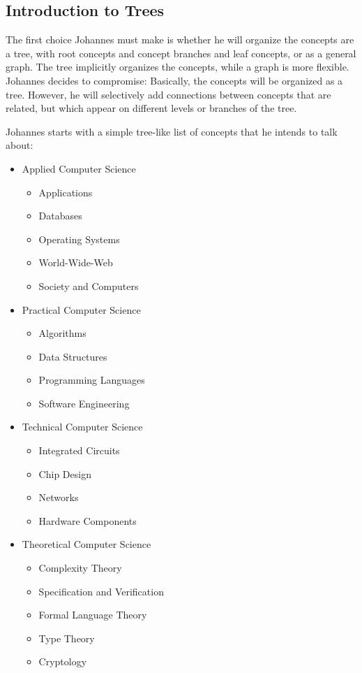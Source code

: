 \subsection{Introduction to Trees}

The first choice Johannes must make is whether he will organize the
concepts are a tree, with root concepts and concept branches and leaf
concepts, or as a general graph. The tree implicitly organizes the
concepts, while a graph is more flexible. Johannes decides to
compromise: Basically, the concepts will be organized as a
tree. However, he will selectively add connections between concepts
that are related, but which appear on different levels or branches of
the tree.

Johannes starts with a simple tree-like list of concepts that he
intends to talk about: 
\begin{itemize}
\item Applied Computer Science
  \begin{itemize}
  \item Applications
  \item Databases
  \item Operating Systems
  \item World-Wide-Web
  \item Society and Computers
  \end{itemize}
\item Practical Computer Science
  \begin{itemize}
  \item Algorithms
  \item Data Structures
  \item Programming Languages
  \item Software Engineering 
  \end{itemize}
\item Technical Computer Science
  \begin{itemize}
  \item Integrated Circuits
  \item Chip Design
  \item Networks
  \item Hardware Components
  \end{itemize}
\item Theoretical Computer Science
  \begin{itemize}
  \item Complexity Theory
  \item Specification and Verification
  \item Formal Language Theory
  \item Type Theory
  \item Cryptology 
  \end{itemize}
\end{itemize}

